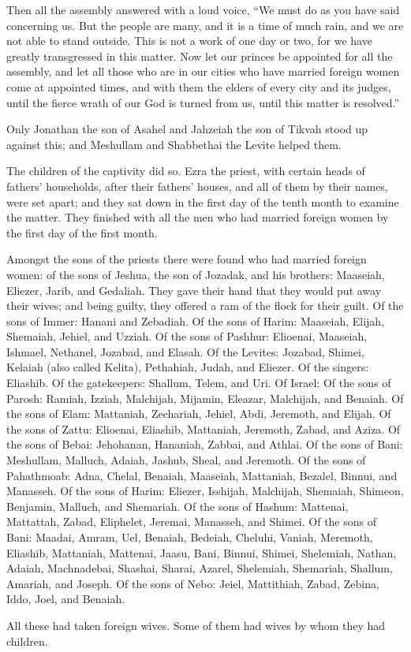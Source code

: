  Then all the assembly answered with a loud voice, ``We
must do as you have said concerning us.  But the people are
many, and it is a time of much rain, and we are not able to stand
outside. This is not a work of one day or two, for we have greatly
transgressed in this matter.  Now let our princes be
appointed for all the assembly, and let all those who are in our cities
who have married foreign women come at appointed times, and with them
the elders of every city and its judges, until the fierce wrath of our
God is turned from us, until this matter is resolved.''

 Only Jonathan the son of Asahel and Jahzeiah the son of
Tikvah stood up against this; and Meshullam and Shabbethai the Levite
helped them.

 The children of the captivity did so. Ezra the priest,
with certain heads of fathers' households, after their fathers' houses,
and all of them by their names, were set apart; and they sat down in the
first day of the tenth month to examine the matter.  They
finished with all the men who had married foreign women by the first day
of the first month.

 Amongst the sons of the priests there were found who had
married foreign women: of the sons of Jeshua, the son of Jozadak, and
his brothers: Maaseiah, Eliezer, Jarib, and Gedaliah.  They
gave their hand that they would put away their wives; and being guilty,
they offered a ram of the flock for their guilt.  Of the
sons of Immer: Hanani and Zebadiah.  Of the sons of Harim:
Maaseiah, Elijah, Shemaiah, Jehiel, and Uzziah.  Of the
sons of Pashhur: Elioenai, Maaseiah, Ishmael, Nethanel, Jozabad, and
Elasah.  Of the Levites: Jozabad, Shimei, Kelaiah (also
called Kelita), Pethahiah, Judah, and Eliezer.  Of the
singers: Eliashib. Of the gatekeepers: Shallum, Telem, and Uri.
 Of Israel: Of the sons of Parosh: Ramiah, Izziah,
Malchijah, Mijamin, Eleazar, Malchijah, and Benaiah.  Of
the sons of Elam: Mattaniah, Zechariah, Jehiel, Abdi, Jeremoth, and
Elijah.  Of the sons of Zattu: Elioenai, Eliashib,
Mattaniah, Jeremoth, Zabad, and Aziza.  Of the sons of
Bebai: Jehohanan, Hananiah, Zabbai, and Athlai.  Of the
sons of Bani: Meshullam, Malluch, Adaiah, Jashub, Sheal, and Jeremoth.
 Of the sons of Pahathmoab: Adna, Chelal, Benaiah,
Maaseiah, Mattaniah, Bezalel, Binnui, and Manasseh.  Of the
sons of Harim: Eliezer, Isshijah, Malchijah, Shemaiah, Shimeon,
 Benjamin, Malluch, and Shemariah.  Of the
sons of Hashum: Mattenai, Mattattah, Zabad, Eliphelet, Jeremai,
Manasseh, and Shimei.  Of the sons of Bani: Maadai, Amram,
Uel,  Benaiah, Bedeiah, Cheluhi,  Vaniah,
Meremoth, Eliashib,  Mattaniah, Mattenai, Jaasu,
 Bani, Binnui, Shimei,  Shelemiah, Nathan,
Adaiah,  Machnadebai, Shashai, Sharai, 
Azarel, Shelemiah, Shemariah,  Shallum, Amariah, and
Joseph.  Of the sons of Nebo: Jeiel, Mattithiah, Zabad,
Zebina, Iddo, Joel, and Benaiah.

 All these had taken foreign wives. Some of them had wives
by whom they had children.
